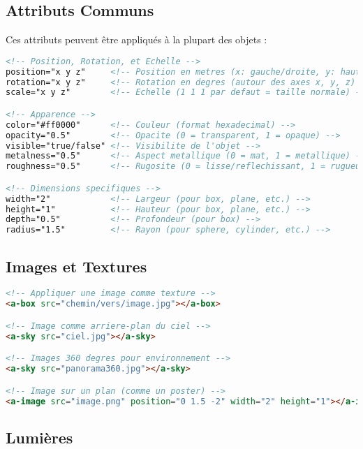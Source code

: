 \documentclass[12pt]{article}
\begin{document}
\subsection{Attributs Communs}

Ces attributs peuvent être appliqués à la plupart des objets :

\begin{lstlisting}[language=HTML]
<!-- Position, Rotation, et Echelle -->
position="x y z"     <!-- Position en metres (x: gauche/droite, y: haut/bas, z: avant/arriere) -->
rotation="x y z"     <!-- Rotation en degres (autour des axes x, y, z) -->
scale="x y z"        <!-- Echelle (1 1 1 par defaut = taille normale) -->

<!-- Apparence -->
color="#ff0000"      <!-- Couleur (format hexadecimal) -->
opacity="0.5"        <!-- Opacite (0 = transparent, 1 = opaque) -->
visible="true/false" <!-- Visibilite de l'objet -->
metalness="0.5"      <!-- Aspect metallique (0 = mat, 1 = metallique) -->
roughness="0.5"      <!-- Rugosite (0 = lisse/reflechissant, 1 = rugueux) -->

<!-- Dimensions specifiques -->
width="2"            <!-- Largeur (pour box, plane, etc.) -->
height="1"           <!-- Hauteur (pour box, plane, etc.) -->
depth="0.5"          <!-- Profondeur (pour box) -->
radius="1.5"         <!-- Rayon (pour sphere, cylinder, etc.) -->
\end{lstlisting}

\subsection{Images et Textures}

\begin{lstlisting}[language=HTML]
<!-- Appliquer une image comme texture -->
<a-box src="chemin/vers/image.jpg"></a-box>

<!-- Image comme arriere-plan du ciel -->
<a-sky src="ciel.jpg"></a-sky>

<!-- Images 360 degres pour environnement -->
<a-sky src="panorama360.jpg"></a-sky>

<!-- Image sur un plan (comme un poster) -->
<a-image src="image.png" position="0 1.5 -2" width="2" height="1"></a-image>
\end{lstlisting}

\subsection{Lumières}
\end{document}
